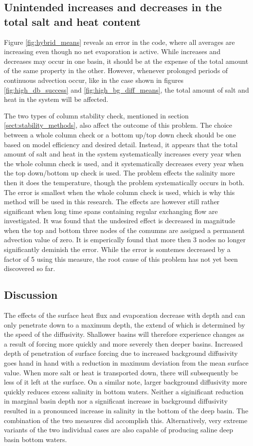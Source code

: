\documentclass[twocolumn]{article}
\begin{document}
\subsection{Unintended increases and decreases in the total salt and heat content}
\label{sect:totals_problem}
Figure \ref{fig:hybrid_means} reveals an error in the code, where all averages are increasing even though no net evaporation is active. While increases and decreases may occur in one basin, it should be at the expense of the total amount of the same property in the other. However, whenever prolonged periods of continuous advection occur, like in the case shown in figures \ref{fig:high_db_success} and \ref{fig:high_bg_diff_means}, the total amount of salt and heat in the system will be affected.

The two types of column stability check, mentioned in section \ref{sect:stability_methods}, also affect the outcome of this problem. The choice between a whole column check or a bottom up/top down check should be one based on model efficiency and desired detail. Instead, it appears that the total amount of salt and heat in the system systematically increases every year when the whole column check is used, and it systematically decreases every year when the top down/bottom up check is used. The problem effects the salinity more then it does the temperature, though the problem systematically occurs in both. 
The error is smallest when the whole column check is used, which is why this method will be used in this research. The effects are however still rather significant when long time spans containing regular exchanging flow are investigated. It was found that the undesired effect is decreased in magnitude when the top and bottom three nodes of the comumns are assigned a permanent advection value of zero. It is emperically found that more then 3 nodes no longer significantly deminish the error. While the error is somtemes decreased by a factor of 5 using this measure, the root cause of this problem has not yet been discovered so far. 

\subsection{Discussion}
The effects of the surface heat flux and evaporation decrease with depth and can only penetrate down to a maximum depth, the extend of which is determined by the speed of the diffusivity. Shallower basins will therefore experience changes as a result of forcing more quickly and more severely then deeper basins. Increased depth of penetration of surface forcing due to increased background diffusivity goes hand in hand with a reduction in maximum deviation from the mean surface value. When more salt or heat is transported down, there will subsequently be less of it left at the surface. On a similar note, larger background diffusivity more quickly reduces excess salinity in bottom waters.
Neither a siginificant reduction in marginal basin depth nor a significant increase in background diffusivity resulted in a pronounced increase in salinity in the bottom of the deep basin. The combination of the two measures did accomplish this. Alternatively, very extreme variants of the two individual cases are also capable of producing saline deep basin bottom waters.
\end{document}
